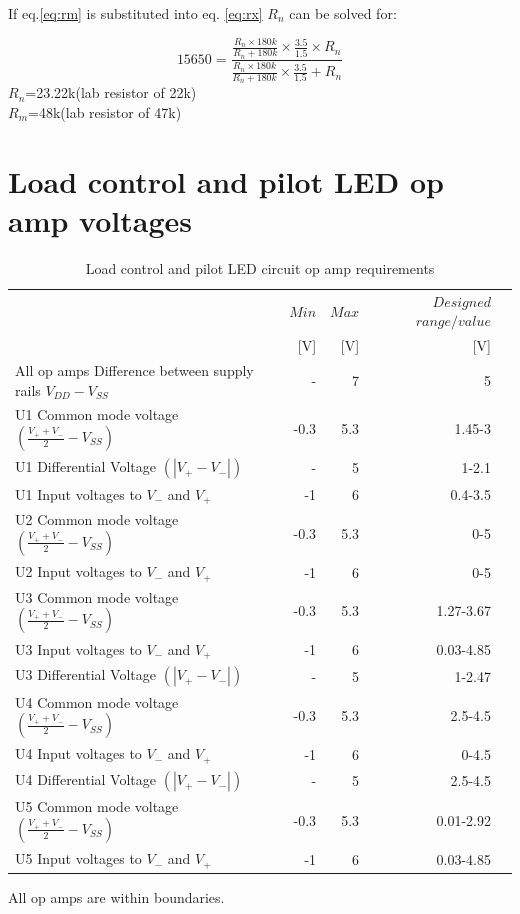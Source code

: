 If eq.\ref{eq:rm} is substituted into eq. \ref{eq:rx} $R_n$ can be solved for: 

\begin{equation}
	15650=\frac{\frac{R_n\times 180k}{R_{n}+180k}\times \frac{3.5}{1.5}\times R_n}{\frac{R_n\times 180k}{R_{n}+180k}\times \frac{3.5}{1.5}+R_n}
\end{equation}
$R_n$=23.22k\textohm (lab resistor of 22k\textohm) \\
$R_m$=48k\textohm (lab resistor of 47k\textohm)


\chapter{Load control and pilot LED op amp voltages}

\label{appen:opamp}


\begin{table}[!htb]
	\centering
	\footnotesize
	\caption[Load Control circuit op amp requirements]{Load control and pilot LED circuit op amp requirements \cite{MCP}}
	\begin{tabular}{lrrrr}
		\toprule
		& $Min$ &$Max$&$Designed$ $range / value$\\
		&[V]&[V]&[V]\\
		\midrule
		All op amps Difference between supply rails $V_{DD} - V_{SS}$ & -& 7  &5   \\
		
		U1 Common mode voltage $(\frac{V_+ + V_-}{2}-V_{SS})$ &  -0.3&5.3&1.45-3\\
		U1 Differential Voltage $ (|V_+ - V_-|)$ & -& 5& 1-2.1  \\
		U1 Input voltages to $V_-$ and $V_+$  &  -1    &6&0.4-3.5 \\
		
		U2 Common mode voltage $(\frac{V_+ + V_-}{2}-V_{SS})$ &  -0.3&5.3&0-5\\
		U2 Input voltages to $V_-$ and $V_+$ &  -1    &6& 0-5 \\
		
		
		U3 Common mode voltage $(\frac{V_+ + V_-}{2}-V_{SS})$ &  -0.3&5.3&1.27-3.67\\
		U3 Input voltages to $V_-$ and $V_+$  &  -1    &6&0.03-4.85 \\
		U3 Differential Voltage $ (|V_+ - V_-|)$ & -& 5&  1-2.47  \\
		
		
		U4 Common mode voltage $(\frac{V_+ + V_-}{2}-V_{SS})$ &  -0.3&5.3&2.5-4.5\\
		U4 Input voltages to $V_-$ and $V_+$  &  -1    &6&0-4.5 \\
		U4 Differential Voltage $ (|V_+ - V_-|)$ & -& 5&  2.5-4.5  \\
		
		U5 Common mode voltage $(\frac{V_+ + V_-}{2}-V_{SS})$ &  -0.3&5.3&0.01-2.92\\
		U5 Input voltages to $V_-$ and $V_+$ &  -1    &6& 0.03-4.85 \\
		
		\bottomrule
	\end{tabular}
	\label{tab:MCPbat}
\end{table}

All op amps are within boundaries.

